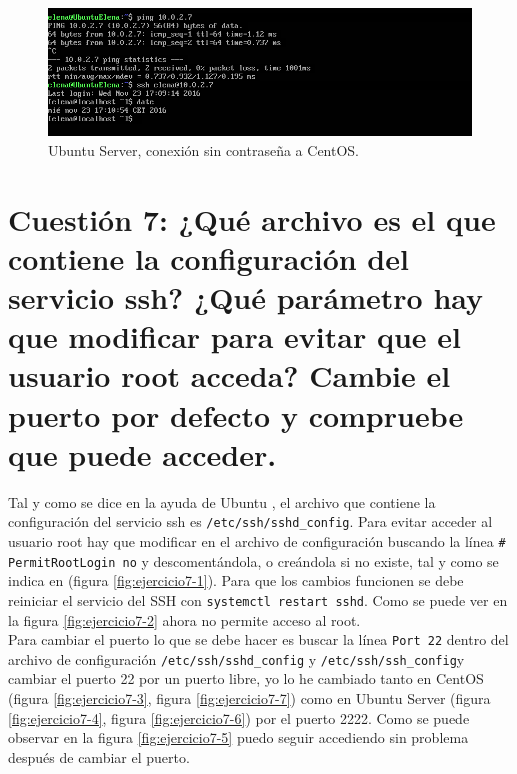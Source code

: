 \begin{figure}[H] 
	\centering
	\includegraphics[width=15cm]{./img/ejercicio6-4.png} 	
	\caption{Ubuntu Server, conexión sin contraseña a CentOS.} \label{fig:ejercicio6-4}
\end{figure}



\section{Cuestión 7: ¿Qué archivo es el que contiene la configuración del servicio ssh? ¿Qué parámetro hay que modificar para evitar que el usuario root acceda? Cambie el puerto por defecto y compruebe que puede acceder.}
 Tal y como se dice en la ayuda de Ubuntu \cite{sshPass}, el archivo que contiene la configuración del servicio ssh es \texttt{/etc/ssh/sshd\_config}.
 Para evitar acceder al usuario root hay que modificar en el archivo de configuración buscando la línea \texttt{\# PermitRootLogin no} y descomentándola, o creándola si no existe, tal y como se indica en \cite{sshConfig} (figura \ref{fig:ejercicio7-1}). Para que los cambios funcionen se debe reiniciar el servicio del SSH con \texttt{systemctl restart sshd}. Como se puede ver en la figura \ref{fig:ejercicio7-2} ahora no permite acceso al root.\\

Para cambiar el puerto lo que se debe hacer es buscar la línea \texttt{Port 22} dentro del archivo de configuración \texttt{/etc/ssh/sshd\_config} y \texttt{/etc/ssh/ssh\_config}y cambiar el puerto 22 por un puerto libre, yo lo he cambiado tanto en CentOS (figura \ref{fig:ejercicio7-3}, figura \ref{fig:ejercicio7-7}) como en Ubuntu Server (figura \ref{fig:ejercicio7-4}, figura \ref{fig:ejercicio7-6}) por el puerto 2222. Como se puede observar en la figura \ref{fig:ejercicio7-5} puedo seguir accediendo sin problema después de cambiar el puerto.
 
